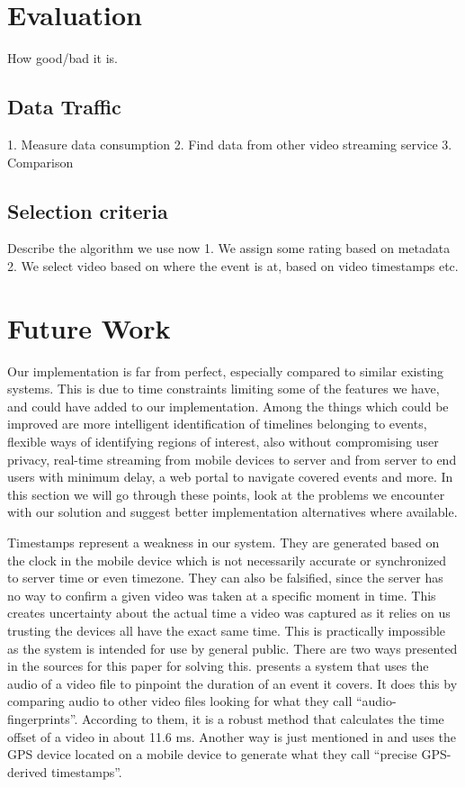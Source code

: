\documentclass[conference]{IEEEtran}
\begin{document}
\section{Evaluation}
How good/bad it is.

\subsection{Data Traffic} 

1. Measure data consumption
2. Find data from other video streaming service
3. Comparison

\subsection{Selection criteria}

Describe the algorithm we use now
1. We assign some rating based on metadata
2. We select video based on where the event is at, based on video timestamps
etc.

\section{Future Work}

Our implementation is far from perfect, especially compared to similar existing systems.
This is due to time constraints limiting some of the features we have, and could have added to our implementation.
Among the things which could be improved are more intelligent identification of timelines belonging to events,
flexible ways of identifying regions of interest, also without compromising user privacy, real-time streaming from mobile devices to server 
and from server to end users with minimum delay, a web portal to navigate covered events and more.
In this section we will go through these points, look at the problems we encounter with our solution 
and suggest better implementation alternatives where available.

Timestamps represent a weakness in our system. They are generated based on the clock in the mobile
device which is not necessarily accurate or synchronized to server time or even timezone. They can also
be falsified, since the server has no way to confirm a given video was taken at a specific moment in time.
This creates uncertainty about the actual time a video was captured as it relies on us trusting the devices
all have the exact same time. This is practically impossible as the system is intended for use by general public. 
There are two ways presented in the sources for this paper for solving this. 
\cite{shrestha_automatic_2010} presents a system that uses the audio of a video file to pinpoint the duration of an event it covers.
It does this by comparing audio to other video files looking for what they call “audio-fingerprints”. 
According to them, it is a robust method that calculates the time offset of a video in about 11.6 ms. 
Another way is just mentioned in \cite{ jain_focus:_2013} and uses the GPS device located on a mobile device
to generate what they call “precise GPS-derived timestamps”.
\end{document}
